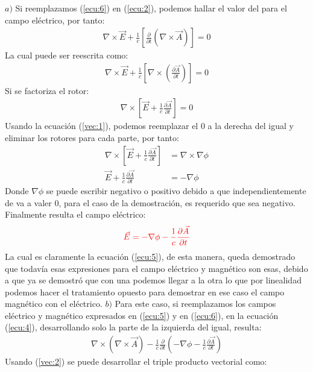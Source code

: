 $a)$ Si reemplazamos (\ref{ecu:6}) en (\ref{ecu:2}), podemos hallar el valor del para el campo eléctrico, por tanto:
\begin{align*}
    \nabla \times \vec{E} + \frac{1}{c} \left[\frac{\partial}{\partial t} \left(\nabla \times \vec{A} \right)\right] = 0
\end{align*}
La cual puede ser reescrita como:
\begin{align*}
    \nabla \times \vec{E} + \frac{1}{c} \left[\nabla \times \left(\frac{\partial \vec{A}}{\partial t}\right)\right] = 0
\end{align*}
Si se factoriza el rotor:
\begin{align*}
    \nabla \times \left[\vec{E} + \frac{1}{c} \frac{\partial \vec{A}}{\partial t}\right] = 0
\end{align*}
Usando la ecuación (\ref{vec:1}), podemos reemplazar el 0 a la derecha del igual y eliminar los rotores para cada parte, por tanto:
\begin{align*}
    \nabla \times \left[\vec{E} + \frac{1}{c} \frac{\partial \vec{A}}{\partial t}\right] &= \nabla \times \nabla \phi\\
    \vec{E} + \frac{1}{c} \frac{\partial \vec{A}}{\partial t} &= -\nabla \phi
\end{align*}
Donde $\nabla \phi$ se puede escribir negativo o positivo debido a que independientemente de va a valer 0, para el caso de la demostración, es requerido que sea negativo. Finalmente resulta el campo eléctrico:
\begin{equation*}
    \textcolor{rojo}{\vec{E} = -\nabla \phi - \frac{1}{c} \frac{\partial \vec{A}}{\partial t}}
\end{equation*}
La cual es claramente la ecuación (\ref{ecu:5}), de esta manera, queda demostrado que todavía esas expresiones para el campo eléctrico y magnético son esas, debido a que ya se demostró que con una podemos llegar a la otra lo que por linealidad podemos hacer el tratamiento opuesto para demostrar en ese caso el campo magnético con el eléctrico.
$b)$ Para este caso, si reemplazamos los campos eléctrico y magnético expresados en (\ref{ecu:5}) y en (\ref{ecu:6}), en la ecuación (\ref{ecu:4}), desarrollando solo la parte de la izquierda del igual, resulta:
\begin{align*}
    \nabla \times \left(\nabla \times \vec{A}\right) - \frac{1}{c} \frac{\partial}{\partial t} \left(- \nabla \phi - \frac{1}{c} \frac{\partial \vec{A}}{\partial t}\right)
\end{align*}
Usando (\ref{vec:2}) se puede desarrollar el triple producto vectorial como:
